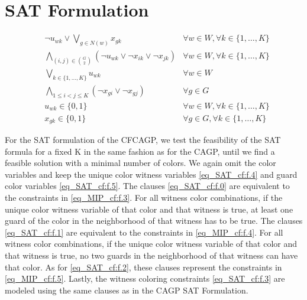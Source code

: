 \section{SAT Formulation}

\begin{align}
\label{eq_SAT_cf:f.0}&\lnot u_{wk} \lor \bigvee_{g \in N(w)}x_{gk} & \forall w \in W, \forall k\in \{1,\ldots,K\}\\
\label{eq_SAT_cf:f.1}&\bigwedge_{(i,j)\in {G\choose 2}} (\lnot u_{wk} \lor \lnot x_{ik} \lor \lnot x_{jk}) & \forall w \in W, \forall k\in \{1,\ldots,K\}\\
\label{eq_SAT_cf:f.2}&\bigvee_{k\in \{1,\ldots,K\}}u_{wk} & \forall w\in W\\
\label{eq_SAT_cf:f.3}&\bigwedge_{1 \leq i < j \leq K} (\lnot x_{gi} \lor \lnot x_{gj}) & \forall g\in G\\
\label{eq_SAT_cf:f.4}& u_{wk} \in \{0,1\} & \forall w\in W, \forall k\in \{1,\ldots,K\}\\
\label{eq_SAT_cf:f.5}& x_{gk} \in \{0,1\} & \forall g\in G, \forall k\in \{1,\ldots,K\}
\end{align}

For the SAT formulation of the CFCAGP, we test the feasibility of the SAT formula for a fixed K in the same fashion as for the CAGP, until we find a feasible solution with a minimal number of colors. We again omit the color variables and keep the unique color witness variables \cref{eq_SAT_cf:f.4} and guard color variables \cref{eq_SAT_cf:f.5}. The clauses \cref{eq_SAT_cf:f.0} are equivalent to the constraints in \cref{eq_MIP_cf:f.3}. For all witness color combinations, if the unique color witness variable of that color and that witness is true, at least one guard of the color in the neighborhood of that witness has to be true. The clauses \cref{eq_SAT_cf:f.1} are equivalent to the constraints in \cref{eq_MIP_cf:f.4}. For all witness color combinations, if the unique color witness variable of that color and that witness is true, no two guards in the neighborhood of that witness can have that color. As for \cref{eq_SAT_cf:f.2}, these clauses represent the constraints in \cref{eq_MIP_cf:f.5}. Lastly, the witness coloring constraints \cref{eq_SAT_cf:f.3} are modeled using the same clauses as in the CAGP SAT Formulation.


